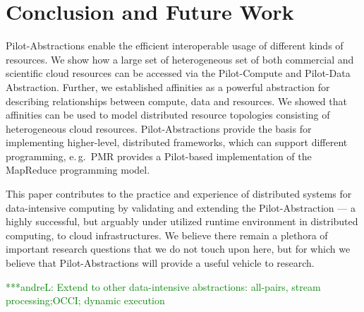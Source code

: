 \documentclass[times]{cpeauth}
\newcommand{\alnote}[1]{ {\textcolor{green} { ***andreL: #1 }}}
\newcommand{\alnote}[1]{}
\newcommand{\pilot}{Pilot\xspace}
\newcommand{\pilotcompute}{Pilot-Compute\xspace}
\newcommand{\pilotdata}{Pilot-Data\xspace}
\begin{document}

\section{Conclusion and Future Work}

\pilot-Abstractions enable the efficient interoperable usage of
different kinds of resources. We show how a large set of heterogeneous
set of both commercial and scientific cloud resources can be accessed
via the \pilotcompute and \pilotdata Abstraction. Further, we
established affinities as a powerful abstraction for describing
relationships between compute, data and resources. We showed that
affinities can be used to model distributed resource topologies
consisting of heterogeneous cloud resources.  \pilot-Abstractions
provide the basis for implementing higher-level, distributed
frameworks, which can support different programming, e.\,g.\ PMR
provides a \pilot-based implementation of the MapReduce programming
model.

This paper contributes to the practice and experience of distributed
systems for data-intensive computing by validating and extending the
\pilot-Abstraction --- a highly successful, but arguably under
utilized runtime environment in distributed computing, to cloud
infrastructures. We believe there remain a plethora of important
research questions that we do not touch upon here, but for which we
believe that \pilot-Abstractions will provide a useful vehicle to
research.

\alnote{Extend to other data-intensive abstractions: all-pairs, stream
  processing;OCCI; dynamic execution}
\end{document}
